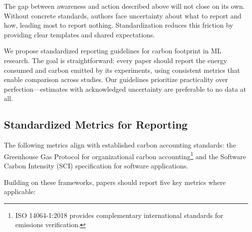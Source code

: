 \documentclass{article}
\theoremstyle{plain}
\theoremstyle{definition}
\theoremstyle{remark}
\begin{document}
The gap between awareness and action described above will not close on its own. Without concrete standards, authors face uncertainty about what to report and how, leading most to report nothing. Standardization reduces this friction by providing clear templates and shared expectations.

We propose standardized reporting guidelines for carbon footprint in ML research. The goal is straightforward: every paper should report the energy consumed and carbon emitted by its experiments, using consistent metrics that enable comparison across studies. Our guidelines prioritize practicality over perfection---estimates with acknowledged uncertainty are preferable to no data at all.

\subsection{Standardized Metrics for Reporting}

The following metrics align with established carbon accounting standards: the Greenhouse Gas Protocol \cite{ghgprotocol2004} for organizational carbon accounting\footnote{ISO 14064-1:2018 provides complementary international standards for emissions verification.} and the Software Carbon Intensity (SCI) specification \cite{greensoftware2022sci} for software applications.

Building on these frameworks, papers should report five key metrics where applicable:
\end{document}
